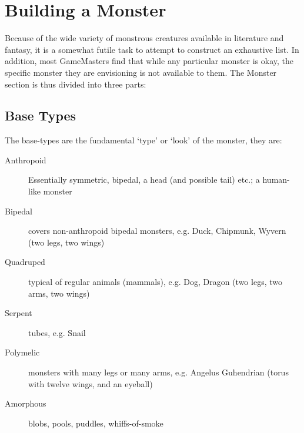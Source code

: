\documentclass[twoside]{book}
\begin{document}
    

\section{Building a Monster}
    
    {  
     Because of the wide variety of monstrous creatures
             available in literature and fantasy, it is a somewhat futile
             task to attempt to construct an exhaustive list. In
             addition, most GameMasters find that while any particular
             monster is okay, the specific monster they are envisioning
             is not available to them. The Monster section is thus
             divided into three parts: 
    }
  
\begin{description}
    
  \item[] 
  \item[] 
  \item[] 
\end{description}
  
    

\subsection{Base Types}
    
    {  
     The base-types are the fundamental
               `type' or `look' of the monster,
               they are: 
    }
  
\begin{description}
    
  \item[Anthropoid] 
    {  
    Essentially symmetric,
                 bipedal, a head (and possible tail) etc.; a human-like
                 monster 
    }
  
  \item[Bipedal] 
    {  
     covers non-anthropoid
                 bipedal monsters, e.g. Duck, Chipmunk, Wyvern (two legs,
                 two wings) 
    }
  
  \item[Quadruped] 
    {  
    typical of regular
                 animals (mammals), e.g. Dog, Dragon (two legs, two arms,
                 two wings) 
    }
  
  \item[Serpent] 
    {  
     tubes, e.g. Snail
    }
  
  \item[Polymelic] 
    {  
    monsters with many legs
                 or many arms, e.g. Angelus Guhendrian (torus with twelve
                 wings, and an eyeball)
    }
  
  \item[Amorphous] 
    {  
    blobs, pools, puddles,
                 whiffs-of-smoke 
    }
  
\end{description}
  
\end{document}
